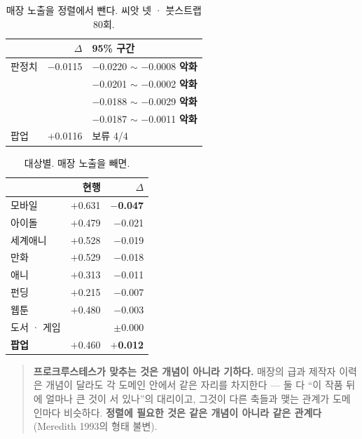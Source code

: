\documentclass[10pt]{article}
\begin{document}
\begin{table}[t]
\centering\tsize
\caption{매장 노출을 정렬에서 뺀다. 씨앗 넷 · 붓스트랩 80회.}
\begin{tabular}{lrl}
\toprule
& $\Delta$ & 95\% 구간 \\
\midrule
판정치 & $-$0.0115 & $-$0.0220 $\sim$ $-$0.0008 \quad \textbf{악화} \\
& & $-$0.0201 $\sim$ $-$0.0002 \quad \textbf{악화} \\
& & $-$0.0188 $\sim$ $-$0.0029 \quad \textbf{악화} \\
& & $-$0.0187 $\sim$ $-$0.0011 \quad \textbf{악화} \\
팝업 & $+$0.0116 & 보류 4/4 \\
\bottomrule
\end{tabular}
\end{table}

\begin{table}[t]
\centering\tsize
\caption{대상별. 매장 노출을 빼면.}
\begin{tabular}{lrr}
\toprule
& 현행 & $\Delta$ \\
\midrule
모바일 & $+$0.631 & \textbf{$-$0.047} \\
아이돌 & $+$0.479 & $-$0.021 \\
세계애니 & $+$0.528 & $-$0.019 \\
만화 & $+$0.529 & $-$0.018 \\
애니 & $+$0.313 & $-$0.011 \\
펀딩 & $+$0.215 & $-$0.007 \\
웹툰 & $+$0.480 & $-$0.003 \\
도서 · 게임 & & $\pm$0.000 \\
\midrule
\textbf{팝업} & $+$0.460 & \textbf{$+$0.012} \\
\bottomrule
\end{tabular}
\end{table}


\begin{quote}\fontsize{9.5}{11.5}\selectfont
\textbf{프로크루스테스가 맞추는 것은 개념이 아니라 기하다.} 매장의 급과
제작자 이력은 개념이 달라도 각 도메인 안에서 같은 자리를 차지한다 --- 둘 다
``이 작품 뒤에 얼마나 큰 것이 서 있나''의 대리이고, 그것이 다른 축들과 맺는
관계가 도메인마다 비슷하다. \textbf{정렬에 필요한 것은 같은 개념이 아니라
같은 관계다}(Meredith 1993의 형태 불변).
\end{quote}
\end{document}
